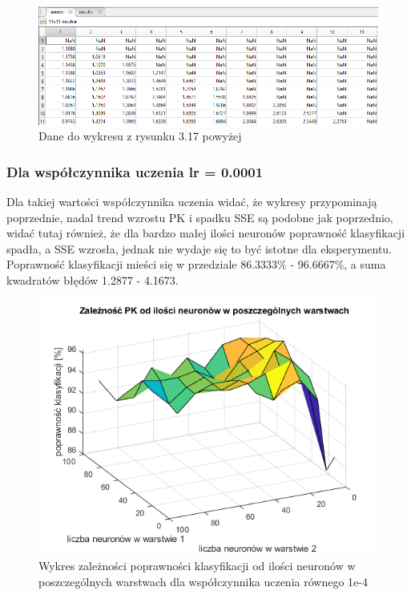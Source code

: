 \documentclass[a4paper, 12pt]{article}
\begin{document}
\begin{figure}[ht]
	\centering
	\includegraphics[width=12cm]{images/lr3 sse dane}
	\caption{Dane do wykresu z rysunku 3.17 powyżej}
\label{Fig:lr1 sse dane}
\end{figure}

\clearpage

\newpage
\subsubsection{Dla współczynnika uczenia lr = 0.0001}
Dla takiej wartości współczynnika uczenia widać, że wykresy przypominają poprzednie, nadal trend wzrostu PK i spadku SSE są podobne jak poprzednio, widać tutaj również, że dla bardzo małej ilości neuronów poprawność klasyfikacji spadła, a SSE wzrosła, jednak nie wydaje się to być istotne dla eksperymentu. Poprawność klasyfikacji mieści się w przedziale 86.3333\% - 96.6667\%, a suma kwadratów błędów 1.2877 - 4.1673.

\begin{figure}[ht]
	\centering
	\includegraphics[width=12cm]{images/lr4 pk}
	\caption{Wykres zależności poprawności klasyfikacji od ilości neuronów w poszczególnych warstwach dla współczynnika uczenia równego 1e-4}
\label{Fig:lr1 pk}
\end{figure}
\end{document}
